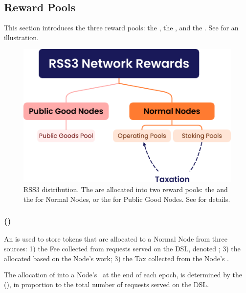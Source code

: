 \subsection{Reward Pools}
\label{subsec:reward_pools}

This section introduces the three reward pools: the , the , and the . See  for an illustration.

    {
        \begin{figure}[tb!]
            \centering
            \includegraphics[width=0.9\columnwidth]{figures/network-rewards.png}
            \caption{RSS3  distribution.
                The  are allocated into two reward pools: the  and the  for Normal Nodes, or the  for Public Good Nodes.
                See  for details.}
            \label{fig:network-rewards}
        \end{figure}
    }

\subsubsection{ (\operationPool)}
\label{subsubsec:operation_pool}

An  is used to store tokens that are allocated to a Normal Node from three sources: 1) the \gls{Fee} collected from requests served on the \gls{DSL}, denoted \work; 3) the  allocated based on the Node’s work; 3) the \gls{Tax} collected from the Node's \stakingPool.

The allocation of  into a Node's \operationPool\ at the end of each epoch, is determined by the  (\work), in proportion to the total number of requests served on the \gls{DSL}.

